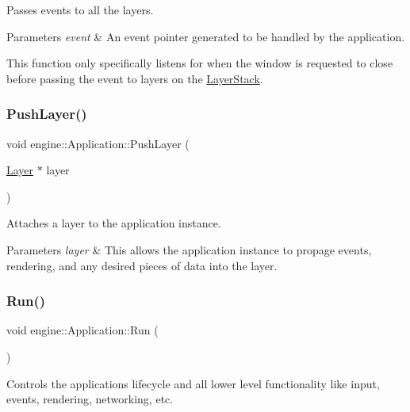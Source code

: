 Passes events to all the layers. 


\begin{DoxyParams}{Parameters}
{\em event} & An event pointer generated to be handled by the application.\\
\hline
\end{DoxyParams}
This function only specifically listens for when the window is requested to close before passing the event to layers on the \hyperlink{classengine_1_1LayerStack}{Layer\+Stack}. \mbox{\label{classengine_1_1Application_adb129a86a6cdbd80b25094d08605d213}} 
\subsubsection{\texorpdfstring{Push\+Layer()}{PushLayer()}}
{\footnotesize\ttfamily void engine\+::\+Application\+::\+Push\+Layer (\begin{DoxyParamCaption}\item[{\hyperlink{classengine_1_1Layer}{Layer} $\ast$}]{layer }\end{DoxyParamCaption})}



Attaches a layer to the application instance. 


\begin{DoxyParams}{Parameters}
{\em layer} & This allows the application instance to propage events, rendering, and any desired pieces of data into the layer. \\
\hline
\end{DoxyParams}
\mbox{\label{classengine_1_1Application_a4dcdf08d920f7f63013a25cb1e80438b}} 
\subsubsection{\texorpdfstring{Run()}{Run()}}
{\footnotesize\ttfamily void engine\+::\+Application\+::\+Run (\begin{DoxyParamCaption}{ }\end{DoxyParamCaption})}



Controls the applications lifecycle and all lower level functionality like input, events, rendering, networking, etc. 

